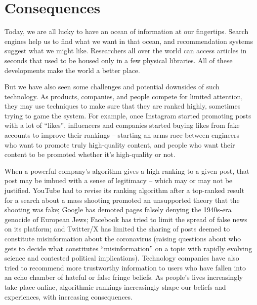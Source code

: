 \section{Consequences}

Today, we are all lucky to have an ocean of information at our fingertips.  Search engines help us to find what we want in that ocean, and recommendation systems suggest what we might like.  Researchers all over the world can access articles in seconds that used to be housed only in a few physical libraries.  All of these developments make the world a better place. 

But we have also seen some challenges and potential downsides of such technology.  As products, companies, and people compete for limited attention, they may use  techniques to make sure that they are ranked highly, sometimes trying to game the system.  For example, once Instagram started promoting posts with a lot of ``likes'', influencers and companies started buying likes from fake accounts to improve their rankings -- starting an arms race between engineers who want to promote truly high-quality content, and people who want their content to be promoted whether it's high-quality or not.

When a powerful company's algorithm gives a high ranking to a given post, that post may be imbued with a sense of legitimacy -- which may or may not be justified.  YouTube had to revise its ranking algorithm after a top-ranked result for a search about a mass shooting promoted an unsupported theory that the shooting was fake; Google has demoted pages falsely denying the 1940s-era genocide of European Jews; Facebook has tried to limit the spread of false news on its platform; and Twitter/X has limited the sharing of posts deemed to constitute misinformation about the coronavirus (raising questions about who gets to decide what constitutes ``misinformation'' on a topic with rapidly evolving science and contested political implications).  Technology companies have also tried to recommend more trustworthy information to users who have fallen into an echo chamber of hateful or false fringe beliefs.  As people's lives increasingly take place online, algorithmic rankings increasingly shape our beliefs and experiences, with increasing consequences.


